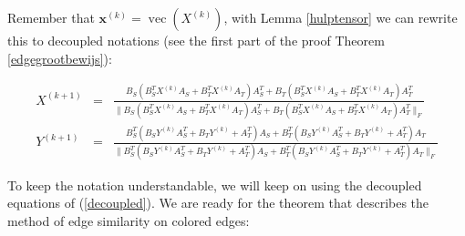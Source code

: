 \documentclass[a4paper,11pt]{report}
\newcommand{\vect}{\operatorname{vec}}
\begin{document}
Remember that $\mathbf{x}^{(k)} = \vect(X^{(k)})$, with Lemma \ref{hulptensor} 
we can rewrite this to decoupled notations (see the first part of the proof Theorem \ref{edgegrootbewijs}):

\begin{eqnarray*}
X^{(k+1)} &=& \frac{B_S (B^T_S X^{(k)}A_S + B^T_T X^{(k)}A_T)A^T_S + B_T (B^T_S X^{(k)}A_S + B^T_T X^{(k)}A_T)A^T_T }{\|B_S (B^T_S X^{(k)}A_S + B^T_T X^{(k)}A_T)A^T_S + B_T (B^T_S X^{(k)}A_S + B^T_T X^{(k)}A_T)A^T_T\|_F} \\
Y^{(k+1)} &=& \frac{B^T_S (B_SY^{(k)}A^T_S + B_TY^{(k)}+A^T_T)A_S + B^T_T(B_SY^{(k)}A^T_S + B_TY^{(k)}+A^T_T)A_T}{\| B^T_S (B_SY^{(k)}A^T_S + B_TY^{(k)}+A^T_T)A_S + B^T_T(B_SY^{(k)}A^T_S + B_TY^{(k)}+A^T_T)A_T\|_F}
\end{eqnarray*}

To keep the notation understandable, we will keep on using the decoupled equations of 
(\ref{decoupled}). We are ready for the theorem that describes the method of 
edge similarity on colored edges:
\end{document}
